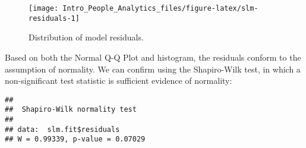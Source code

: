 \documentclass[
]{book}
\newenvironment{Shaded}{\begin{snugshade}}{\end{snugshade}}
\newcommand{\AttributeTok}[1]{\textcolor[rgb]{0.77,0.63,0.00}{#1}}
\newcommand{\CommentTok}[1]{\textcolor[rgb]{0.56,0.35,0.01}{\textit{#1}}}
\newcommand{\FloatTok}[1]{\textcolor[rgb]{0.00,0.00,0.81}{#1}}
\newcommand{\FunctionTok}[1]{\textcolor[rgb]{0.00,0.00,0.00}{#1}}
\newcommand{\NormalTok}[1]{#1}
\newcommand{\SpecialCharTok}[1]{\textcolor[rgb]{0.00,0.00,0.00}{#1}}
\newcommand{\StringTok}[1]{\textcolor[rgb]{0.31,0.60,0.02}{#1}}
\begin{document}
\begin{Shaded}
\end{Shaded}

\begin{figure}

{\centering \texttt{[image: Intro\_People\_Analytics\_files/figure-latex/slm-residuals-1]} 

}

\caption{Distribution of model residuals.}\label{fig:slm-residuals}
\end{figure}

Based on both the Normal Q-Q Plot and histogram, the residuals conform to the assumption of normality. We can confirm using the Shapiro-Wilk test, in which a non-significant test statistic is sufficient evidence of normality:

\begin{Shaded}
\end{Shaded}

\begin{verbatim}
## 
##  Shapiro-Wilk normality test
## 
## data:  slm.fit$residuals
## W = 0.99339, p-value = 0.07029
\end{verbatim}
\end{document}
